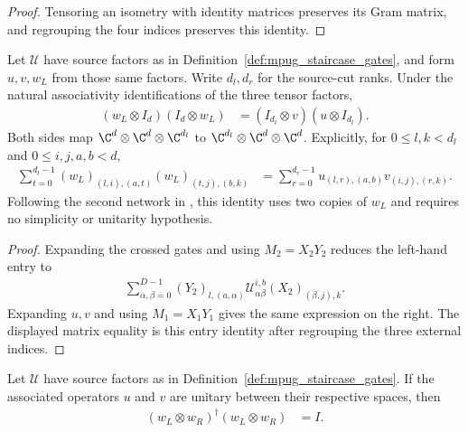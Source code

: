 \begin{proof}\leanok
    Tensoring an isometry with identity matrices preserves its Gram
    matrix, and regrouping the four indices preserves this identity.
\end{proof}

\begin{lemma}
    \label{thm:mpug_staircase_second_network}
    \leanok
    Let $\mathcal U$ have source factors as in
    Definition~\ref{def:mpug_staircase_gates}, and form $u,v,w_L$ from
    those same factors. Write $d_l,d_r$ for the source-cut ranks. Under
    the natural associativity identifications of the three tensor factors,
    \begin{align}
        (w_L\otimes I_d)(I_d\otimes w_L)
         & =(I_{d_l}\otimes v)(u\otimes I_{d_l}).
    \end{align}
    Both sides map $\C^d\otimes\C^d\otimes\C^{d_l}$ to
    $\C^{d_l}\otimes\C^d\otimes\C^d$. Explicitly, for
    $0\leq l,k<d_l$ and $0\leq i,j,a,b<d$,
    \begin{align}
        \sum_{t=0}^{d_l-1}(w_L)_{(l,i),(a,t)}(w_L)_{(t,j),(b,k)}
         & =\sum_{r=0}^{d_r-1}u_{(l,r),(a,b)}v_{(i,j),(r,k)}.
    \end{align}
    Following the second network in
    \cite[lines~977--1011]{FrancoRubio2025MPUGauging}, this identity uses
    two copies of $w_L$ and requires no simplicity or unitarity hypothesis.
\end{lemma}

\begin{proof}\leanok
    Expanding the crossed gates and using $M_2=X_2Y_2$ reduces the
    left-hand entry to
    \begin{align}
        \sum_{\alpha,\beta=0}^{D-1}
        (Y_2)_{l,(a,\alpha)}\mathcal U^{i,b}_{\alpha\beta}
        (X_2)_{(\beta,j),k}.
    \end{align}
    Expanding $u,v$ and using $M_1=X_1Y_1$ gives the same expression on
    the right. The displayed matrix equality is this entry identity
    after regrouping the three external indices.
\end{proof}

\begin{lemma}
    \label{thm:mpug_staircase_first_network_isometry}
    \leanok
    Let $\mathcal U$ have source factors as in
    Definition~\ref{def:mpug_staircase_gates}. If the associated operators
    $u$ and $v$ are unitary between their respective spaces, then
    \begin{align}
        (w_L\otimes w_R)^\dagger(w_L\otimes w_R) & =I.
    \end{align}
\end{lemma}

